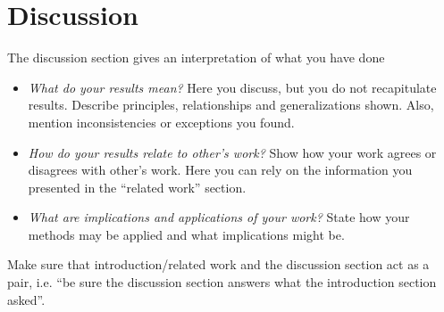 %
\newpage
\chapter{Discussion}
\label{ch:discussion}
The discussion section gives an interpretation of what you have done

\begin{itemize}
 \item \textit{What do your results mean?} Here you discuss, but you do not recapitulate results. Describe principles, relationships and generalizations shown. Also, mention inconsistencies or exceptions you found.
 \item \textit{How do your results relate to other's work?} Show how your work agrees or disagrees with other's work. Here you can rely on the information you presented in the ``related work'' section.
 \item \textit{What are implications and applications of your work?} State how your methods may be applied and what implications might be. 
\end{itemize}

\noindent Make sure that introduction/related work and the discussion section act as a pair, i.e. ``be sure the discussion section answers what the introduction section asked''. 
